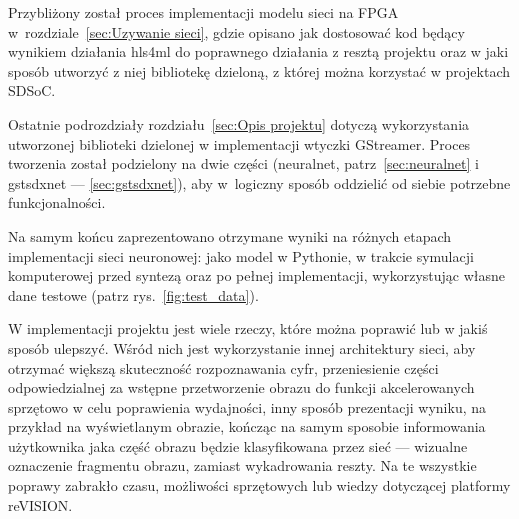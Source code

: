 \documentclass[12pt, oneside, a4paper]{article}
\begin{document}
Przybliżony został proces implementacji modelu sieci na FPGA
w~rozdziale~\ref{sec:Uzywanie sieci}, gdzie opisano jak dostosować kod będący
wynikiem działania hls4ml do poprawnego działania z resztą projektu
oraz w jaki sposób utworzyć z niej bibliotekę dzieloną, z której można
korzystać w projektach SDSoC.

Ostatnie podrozdziały rozdziału~\ref{sec:Opis projektu} dotyczą
wykorzystania utworzonej biblioteki dzielonej w implementacji wtyczki
GStreamer. Proces tworzenia został podzielony na dwie części (neuralnet,
patrz~\ref{sec:neuralnet} i gstsdxnet --- \ref{sec:gstsdxnet}), aby
w~logiczny sposób oddzielić od siebie potrzebne funkcjonalności.

Na samym końcu zaprezentowano otrzymane wyniki na różnych etapach
implementacji sieci neuronowej: jako model w Pythonie, w trakcie symulacji
komputerowej przed syntezą oraz po pełnej implementacji, wykorzystując
własne dane testowe (patrz rys.~\ref{fig:test_data}).

W implementacji projektu jest wiele rzeczy, które można poprawić lub
w jakiś sposób ulepszyć. Wśród nich jest wykorzystanie innej architektury
sieci, aby otrzymać większą skuteczność rozpoznawania cyfr, przeniesienie
części odpowiedzialnej za wstępne przetworzenie obrazu do funkcji
akcelerowanych sprzętowo w celu poprawienia wydajności, inny sposób
prezentacji wyniku, na przykład na wyświetlanym obrazie, kończąc
na samym sposobie informowania użytkownika jaka część obrazu będzie
klasyfikowana przez sieć --- wizualne oznaczenie fragmentu obrazu, zamiast
wykadrowania reszty. Na te wszystkie poprawy zabrakło czasu, możliwości
sprzętowych lub wiedzy dotyczącej platformy reVISION.

\restoregeometry{}
\end{document}
